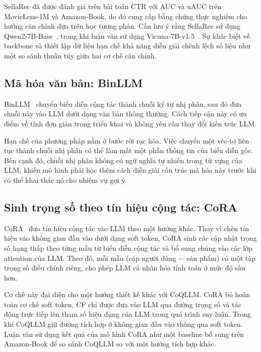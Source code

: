 SellaRec đã được đánh giá trên bài toán CTR với AUC và uAUC trên MovieLens-1M và Amazon-Book, do đó
cung cấp bằng chứng thực nghiệm cho hướng căn chỉnh dựa trên học tương phản. 
Cần lưu ý rằng SellaRec sử dụng Qwen2-7B-Base~\cite{qwen2}, trong khi luận văn sử dụng
Vicuna-7B-v1.5~\cite{vicuna2023}. Sự khác biệt về backbone và thiết lập dữ liệu hạn chế khả
năng diễn giải chênh lệch số liệu như một so sánh thuần túy giữa hai cơ chế căn chỉnh.

\subsection{Mã hóa văn bản: BinLLM}
\label{ssec:binllm}

BinLLM~\cite{binllm2024} chuyển biểu diễn cộng tác thành chuỗi ký tự nhị phân, sau đó đưa
chuỗi này vào LLM dưới dạng văn bản thông thường. Cách tiếp cận này có ưu điểm về tính đơn giản trong
triển khai và không yêu cầu thay đổi kiến trúc LLM.

Hạn chế của phương pháp nằm ở bước rời rạc hóa. Việc chuyển một véc-tơ liên tục thành chuỗi
nhị phân có thể làm mất một phần thông tin của biểu diễn gốc. Bên cạnh đó, chuỗi nhị
phân không có ngữ nghĩa tự nhiên trong từ vựng của LLM, khiến mô hình phải học thêm cách
diễn giải cấu trúc mã hóa này trước khi có thể khai thác nó cho nhiệm vụ gợi ý.

\subsection{Sinh trọng số theo tín hiệu cộng tác: CoRA}
\label{ssec:cora-rel}

CoRA~\cite{cora2024} đưa tín hiệu cộng tác vào LLM theo một hướng khác. Thay vì chèn tín
hiệu vào không gian đầu vào dưới dạng soft token, CoRA sinh các cập nhật trọng số
hạng thấp theo từng mẫu từ biểu diễn cộng tác và bổ sung chúng vào các lớp attention của
LLM. Theo đó, mỗi mẫu (cặp người dùng -– sản phẩm) có một tập trọng số điều chỉnh riêng, cho phép
LLM cá nhân hóa tính toán ở mức độ sâu hơn.

Cơ chế này đại diện cho một hướng thiết kế khác với CoQLLM. CoRA bỏ hoàn toàn cơ chế soft token,
CF chỉ được đưa vào LLM qua đường trọng số và tác động trực tiếp lên
tham số hiệu dụng của LLM trong quá trình suy luận. Trong khi CoQLLM giữ đường tích hợp ở
không gian đầu vào thông qua soft token. Luận văn sử dụng kết quả của mô hình CoRA như một baseline
bổ sung trên Amazon-Book để so sánh CoQLLM so với một hướng tích hợp khác.

